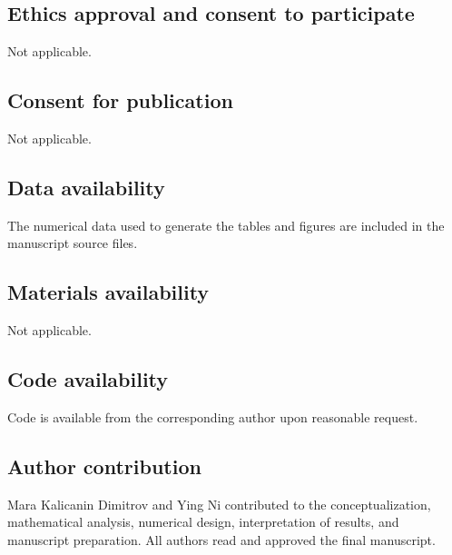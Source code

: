 \documentclass[pdflatex,sn-mathphys-num]{sn-jnl}
\theoremstyle{thmstyleone}%
\theoremstyle{thmstylethree}%
\theoremstyle{thmstyletwo}%
\begin{document}
\subsection*{Ethics approval and consent to participate}
Not applicable.

\subsection*{Consent for publication}
Not applicable.

\subsection*{Data availability}
The numerical data used to generate the tables and figures are included in the manuscript source files.

\subsection*{Materials availability}
Not applicable.

\subsection*{Code availability}
Code is available from the corresponding author upon reasonable request.

\subsection*{Author contribution}
Mara Kalicanin Dimitrov and Ying Ni contributed to the conceptualization, mathematical analysis, numerical design, interpretation of results, and manuscript preparation. All authors read and approved the final manuscript.
\end{document}
